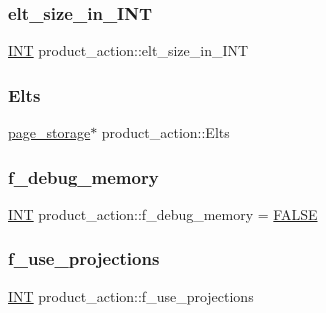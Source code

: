 \subsubsection{\texorpdfstring{elt\+\_\+size\+\_\+in\+\_\+\+I\+NT}{elt\_size\_in\_INT}}
{\footnotesize\ttfamily \mbox{\hyperlink{galois_8h_a09fddde158a3a20bd2dcadb609de11dc}{I\+NT}} product\+\_\+action\+::elt\+\_\+size\+\_\+in\+\_\+\+I\+NT}

\mbox{\label{classproduct__action_a239666d3db58ebaeeae86330082177b4}} 
\subsubsection{\texorpdfstring{Elts}{Elts}}
{\footnotesize\ttfamily \mbox{\hyperlink{classpage__storage}{page\+\_\+storage}}$\ast$ product\+\_\+action\+::\+Elts}

\mbox{\label{classproduct__action_a3a59e72914ec87b5cd7b8d93ee5d2b66}} 
\subsubsection{\texorpdfstring{f\+\_\+debug\+\_\+memory}{f\_debug\_memory}}
{\footnotesize\ttfamily \mbox{\hyperlink{galois_8h_a09fddde158a3a20bd2dcadb609de11dc}{I\+NT}} product\+\_\+action\+::f\+\_\+debug\+\_\+memory = \mbox{\hyperlink{nauty_8h_aa93f0eb578d23995850d61f7d61c55c1}{F\+A\+L\+SE}}\hspace{0.3cm}{\ttfamily [static]}}

\mbox{\label{classproduct__action_ac2cdcc17f994aa2b9022e043120fb192}} 
\subsubsection{\texorpdfstring{f\+\_\+use\+\_\+projections}{f\_use\_projections}}
{\footnotesize\ttfamily \mbox{\hyperlink{galois_8h_a09fddde158a3a20bd2dcadb609de11dc}{I\+NT}} product\+\_\+action\+::f\+\_\+use\+\_\+projections}


